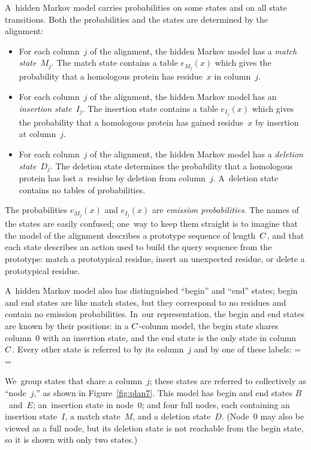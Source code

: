 \documentclass[]{jfp1}
\newcommand\alignwidth{\ensuremath C} %
\newcommand\figref[1]{Figure~\ref{fig:#1}}
\newif\ifverbatimsmall
\newcommand\smallverbatiminput[1]{%
  \verbatimsmalltrue
  \presvtopsep=\topsep
  \topsep=0.78\topsep
  \verbatimsmallfalse
  \topsep=\presvtopsep
}
\begin{document}
A~hidden Markov model carries probabilities on some states and on all
state transitions.
Both the probabilities and the states are determined by the alignment:
\begin{itemize}
\item
For each column~$j$ of the alignment, the hidden Markov model has a
\emph{match state}~$M_j$.
The match state contains a table $e_{M_j}(x)$ which gives the
 probability that a homologous protein has residue~$x$ in
 column~$j$.
\item 
For each column~$j$ of the alignment, the hidden Markov model has an
\emph{insertion state}~$I_j$.
The insertion state contains a table $e_{I_j}(x)$ which gives the
probability that a homologous protein has gained residue~$x$ by
insertion at column~$j$.
\item
For each column~$j$ of the alignment, the hidden Markov model has a
\emph{deletion state}~$D_j$.
The deletion state determines the probability that a homologous protein
has lost a~residue by deletion from column~$j$.
A~deletion state contains no tables of probabilities.
\hfuzz=1.5pt %
\end{itemize}
The probabilities $e_{M_j}(x)$ and $e_{I_j}(x)$ are \emph{emission probabilities}.
The names of the states are easily confused;
one~way to keep them straight is to imagine that the model of the
alignment describes a prototype sequence of length~$\alignwidth$,
and that each state describes an action used to build the query
sequence from the prototype: 
match a prototypical residue,
insert an unexpected residue,
or
delete a prototypical residue.


A~hidden Markov model also has distinguished ``begin'' and ``end''
states; begin and end states are like match states, but they
correspond to no residues and contain no emission probabilities.
In~our representation, 
the begin and end states are known by their positions:
in a $\alignwidth$-column model, the begin state shares
column~0 with an insertion state, and the end state is the only state
in column~$\alignwidth$. 
Every other state is referred to by its column~$j$
and by one of these labels:\label{code:state-label}
\smallverbatiminput{statelabel}
We~group states that share a column~$j$; these states are referred
to collectively as ``node~$j$,'' as shown in \figref{plan7}.
This model
has begin and end states $B$~and~$E$;
an~insertion state in node~0; and
four
full nodes, each containing 
an insertion state~$I$, 
a match state~$M$, and a
deletion state~$D$.
(Node~0 may also be viewed as a full node, but its deletion state is
not reachable from the begin state, so it is shown with only two
states.) 
\end{document}

